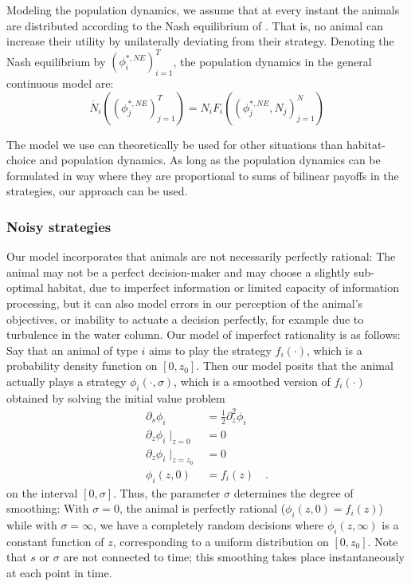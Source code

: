 Modeling the population dynamics, we assume that at every instant the animals are distributed according to the Nash equilibrium of . That is, no animal can increase their utility by unilaterally deviating from their strategy. Denoting the Nash equilibrium by $(\phi_i^{*,NE})^T_{i=1}$, the population dynamics in the general continuous model are:
\begin{equation}
  \dot{N_i}((\phi_j^{*,NE})_{j=1}^T ) = N_i F_i((\phi_j^{*,NE},N_j)_{j=1}^N)
\end{equation}

The model we use can theoretically be used for other situations than habitat-choice and population dynamics. As long as the population dynamics can be formulated in way where they are proportional to sums of bilinear payoffs in the strategies, our approach can be used.



\subsubsection{Noisy strategies}
Our model incorporates that animals are not necessarily perfectly rational: The animal may not be a perfect decision-maker and may choose a slightly sub-optimal habitat, due to imperfect information or limited capacity of information processing, but it can also model errors in our perception of the animal's objectives, or inability to actuate a decision perfectly, for example due to turbulence in the water column. Our model of imperfect rationality is as follows: Say that an animal of type $i$ aims to play the strategy $f_i(\cdot)$, which is a probability density function on $[0,z_0]$. Then our model posits that the animal actually plays a strategy $\phi_i(\cdot ,\sigma)$, which is a smoothed version of $f_i(\cdot)$ obtained by solving the initial value problem
\begin{equation}
  \begin{split}
  \label{eq:density_PDE}
  \partial_s \phi_i &= \frac{1}{2}\partial_z^2 \phi_i \\
  \partial_z \phi_i \mid_{z=0} &= 0 \\
  \partial_z \phi_i \mid_{z = z_0} &= 0 \\
   \phi_i(z,0) &= f_i(z) \quad .
 \end{split}
\end{equation}
on the interval $[0,\sigma]$. Thus, the parameter $\sigma$ determines the degree of smoothing: With $\sigma=0$, the animal is perfectly rational ($\phi_i(z,0)=f_i(z)$) while with $\sigma=\infty$, we have a completely random decisions where $\phi_i(z,\infty)$ is a constant function of $z$, corresponding to a uniform distribution on $[0,z_0]$. Note that $s$ or $\sigma$ are not connected to time; this smoothing takes place instantaneously at each point in time.

